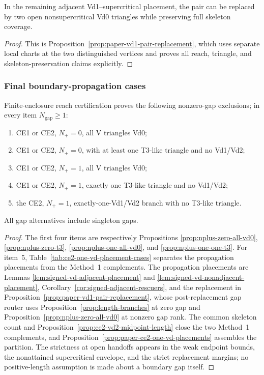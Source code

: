\begin{lemma}
\label{lem:vd1-pair-replacement}
In the remaining adjacent Vd1--supercritical placement, the pair can be
replaced by two open nonsupercritical Vd0 triangles while preserving full skeleton
coverage.
\end{lemma}

\begin{proof}
This is Proposition~\ref{prop:paper-vd1-pair-replacement}, which uses separate
local charts at the two distinguished vertices and proves all reach, triangle, and
skeleton-preservation claims explicitly.
\end{proof}

\subsubsection{Final boundary-propagation cases}

\begin{proposition}
\label{prop:demand-branches}
Finite-enclosure reach certification proves the following nonzero-gap exclusions; in
every item $N_{\mathrm{gap}}\ge1$:
\begin{enumerate}
\item CE1 or CE2, $N_+=0$, all V triangles Vd0;
\item CE1 or CE2, $N_+=0$, with at least one T3-like triangle and no Vd1/Vd2;
\item CE1 or CE2, $N_+=1$, all V triangles Vd0;
\item CE1 or CE2, $N_+=1$, exactly one T3-like triangle and no Vd1/Vd2;
\item the CE2, $N_+=1$, exactly-one-Vd1/Vd2 branch with no T3-like
triangle.
\end{enumerate}
All gap alternatives include singleton gaps.
\end{proposition}

\begin{proof}
The first four items are respectively Propositions
\ref{prop:nplus-zero-all-vd0}, \ref{prop:nplus-zero-t3},
\ref{prop:nplus-one-all-vd0}, and \ref{prop:nplus-one-one-t3}.
For item~5, Table~\ref{tab:ce2-one-vd-placement-cases} separates the
propagation placements from the Method~1 complements.  The propagation
placements are Lemmas \ref{lem:signed-vd-adjacent-placement} and
\ref{lem:signed-vd-nonadjacent-placement},
Corollary~\ref{cor:signed-adjacent-rescuers}, and the replacement in
Proposition~\ref{prop:paper-vd1-pair-replacement}, whose post-replacement gap
router uses Proposition~\ref{prop:length-branches} at zero gap and
Proposition~\ref{prop:nplus-zero-all-vd0} at nonzero gap rank.  The common skeleton count and
Proposition~\ref{prop:ce2-vd2-midpoint-length} close the two Method~1
complements, and Proposition~\ref{prop:paper-ce2-one-vd-placements} assembles
the partition.  The strictness at open handoffs appears in
the weak endpoint bounds, the nonattained supercritical envelope, and the
strict replacement margins; no positive-length assumption is made about a
boundary gap itself.
\end{proof}

